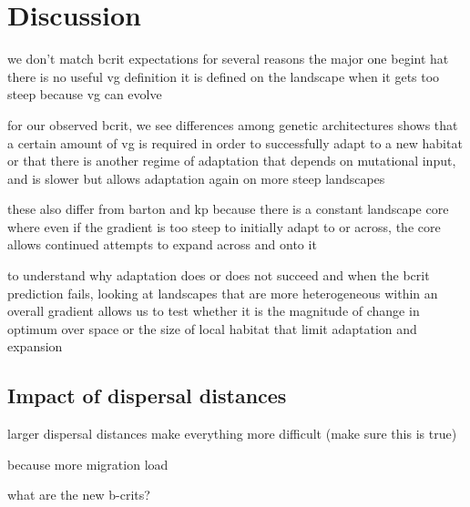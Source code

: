 \section{Discussion}

we don't match bcrit expectations for several reasons
the major one begint hat there is no useful vg definition
it is defined on the landscape when it gets too steep
because vg can evolve

for our observed bcrit, we see differences among genetic architectures
shows that a certain amount of vg is required in order to successfully adapt to a new habitat
or that there is another regime of adaptation that depends on mutational input, and is slower but allows adaptation again on more steep landscapes

these also differ from barton and kp because there is a constant landscape core where even if the gradient is too steep to initially adapt to or across, the core allows continued attempts to expand across and onto it



to understand why adaptation does or does not succeed and when the bcrit prediction fails, looking at landscapes that are more heterogeneous within an overall gradient allows us to test whether it is the magnitude of change in optimum over space or the size of local habitat that limit adaptation and expansion


\subsection{Impact of dispersal distances}

larger dispersal distances make everything more difficult (make sure this is true)

because more migration load

what are the new b-crits?



